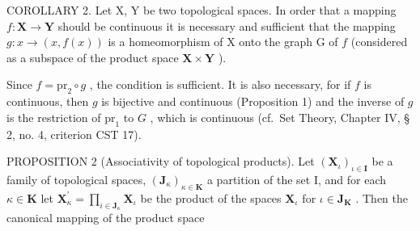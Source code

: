 COROLLARY 2. Let X, Y be two topological spaces. In order that a mapping \(f: \mathbf{X} \to \mathbf{Y}\) should be continuous it is necessary and sufficient that the mapping \(g: x \to (x, f(x))\) is a homeomorphism of X onto the graph G of \(f\) (considered as a subspace of the product space \(\mathbf{X} \times \mathbf{Y}\) ).

Since \(f = \mathrm{pr}_2 \circ g\) , the condition is sufficient. It is also necessary, for if \(f\) is continuous, then \(g\) is bijective and continuous (Proposition 1) and the inverse of \(g\) is the restriction of \(\mathrm{pr}_1\) to \(G\) , which is continuous (cf.~Set Theory, Chapter IV, § 2, no. 4, criterion CST 17).

PROPOSITION 2 (Associativity of topological products). Let \((\mathbf{X}_{\iota})_{\iota \in \mathbf{I}}\) be a family of topological spaces, \((\mathbf{J}_{\kappa})_{\kappa \in \mathbf{K}}\) a partition of the set I, and for each \(\kappa \in \mathbf{K}\) let \(\mathbf{X}_{\kappa}^{\prime} = \prod_{i\in \mathbf{J}_{\kappa}}\mathbf{X}_{\iota}\) be the product of the spaces \(\mathbf{X}_{\iota}\) for \(\iota \in \mathbf{J}_{\mathbf{K}}\) . Then the canonical mapping of the product space
